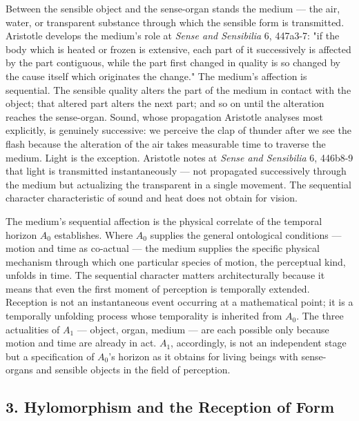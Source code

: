 \documentclass[12pt]{article}
\begin{document}
Between the sensible object and the sense-organ stands the medium --- the air, water, or transparent substance through which the sensible form is transmitted. Aristotle develops the medium's role at \textit{Sense and Sensibilia} 6, 447a3-7: "if the body which is heated or frozen is extensive, each part of it successively is affected by the part contiguous, while the part first changed in quality is so changed by the cause itself which originates the change." The medium's affection is sequential. The sensible quality alters the part of the medium in contact with the object; that altered part alters the next part; and so on until the alteration reaches the sense-organ. Sound, whose propagation Aristotle analyses most explicitly, is genuinely successive: we perceive the clap of thunder after we see the flash because the alteration of the air takes measurable time to traverse the medium. Light is the exception. Aristotle notes at \textit{Sense and Sensibilia} 6, 446b8-9 that light is transmitted instantaneously --- not propagated successively through the medium but actualizing the transparent in a single movement. The sequential character characteristic of sound and heat does not obtain for vision.

The medium's sequential affection is the physical correlate of the temporal horizon $A_0$ establishes. Where $A_0$ supplies the general ontological conditions --- motion and time as co-actual --- the medium supplies the specific physical mechanism through which one particular species of motion, the perceptual kind, unfolds in time. The sequential character matters architecturally because it means that even the first moment of perception is temporally extended. Reception is not an instantaneous event occurring at a mathematical point; it is a temporally unfolding process whose temporality is inherited from $A_0$. The three actualities of $A_1$ --- object, organ, medium --- are each possible only because motion and time are already in act. $A_1$, accordingly, is not an independent stage but a specification of $A_0$'s horizon as it obtains for living beings with sense-organs and sensible objects in the field of perception.

\subsection*{3. Hylomorphism and the Reception of Form}
\end{document}
